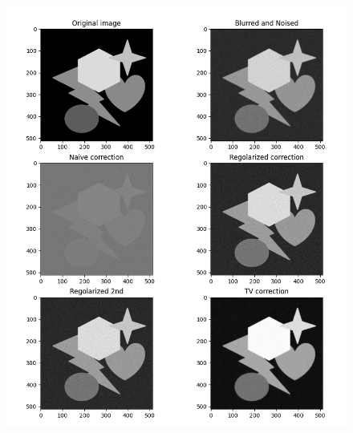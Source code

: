 \documentclass[12pt]{article}
\begin{document}
    \begin{figure}[h!]
    \centering
    \includegraphics[width=14cm]{sample5}
    \end{figure}
    \newpage
\end{document}
